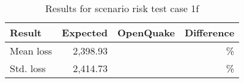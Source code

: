 \begin{table}[htbp]

\centering
\begin{tabular}{ l r r r }

\hline
\rowcolor{anti-flashwhite}
\bf{Result} & \bf{Expected} & \bf{OpenQuake} & \bf{Difference}\\
\hline
Mean loss & 2,398.93 &  & \% \\
Std. loss & 2,414.73 &  & \% \\
\hline
\end{tabular}

\caption{Results for scenario risk test case 1f}
\label{tab:result-scenario-risk-1f}
\end{table}